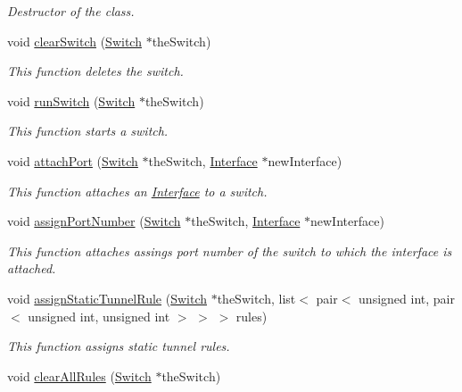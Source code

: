 \begin{DoxyCompactItemize}
\begin{DoxyCompactList}\small\item\em \-Destructor of the class. \end{DoxyCompactList}\item 
void \hyperlink{classOVS__1__10_a60b15eddc54dd221faaa4fcedc1d4b9f}{clear\-Switch} (\hyperlink{classSwitch}{\-Switch} $\ast$the\-Switch)
\begin{DoxyCompactList}\small\item\em \-This function deletes the switch. \end{DoxyCompactList}\item 
void \hyperlink{classOVS__1__10_a95a3d85c485d31894781399659131785}{run\-Switch} (\hyperlink{classSwitch}{\-Switch} $\ast$the\-Switch)
\begin{DoxyCompactList}\small\item\em \-This function starts a switch. \end{DoxyCompactList}\item 
void \hyperlink{classOVS__1__10_ad2486267f5fdac8d3c090e02a257adf2}{attach\-Port} (\hyperlink{classSwitch}{\-Switch} $\ast$the\-Switch, \hyperlink{classInterface}{\-Interface} $\ast$new\-Interface)
\begin{DoxyCompactList}\small\item\em \-This function attaches an \hyperlink{classInterface}{\-Interface} to a switch. \end{DoxyCompactList}\item 
void \hyperlink{classOVS__1__10_a8b59636edb75e44b7c49216cc364fcbc}{assign\-Port\-Number} (\hyperlink{classSwitch}{\-Switch} $\ast$the\-Switch, \hyperlink{classInterface}{\-Interface} $\ast$new\-Interface)
\begin{DoxyCompactList}\small\item\em \-This function attaches assings port number of the switch to which the interface is attached. \end{DoxyCompactList}\item 
void \hyperlink{classOVS__1__10_a533b98f6bdd03b98e916870fa72904c2}{assign\-Static\-Tunnel\-Rule} (\hyperlink{classSwitch}{\-Switch} $\ast$the\-Switch, list$<$ pair$<$ unsigned int, pair$<$ unsigned int, unsigned int $>$ $>$ $>$ rules)
\begin{DoxyCompactList}\small\item\em \-This function assigns static tunnel rules. \end{DoxyCompactList}\item 
void \hyperlink{classOVS__1__10_a3c2d7be964be6fc4f1de8a1fd347e2e8}{clear\-All\-Rules} (\hyperlink{classSwitch}{\-Switch} $\ast$the\-Switch)

\end{DoxyCompactItemize}
